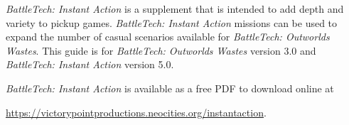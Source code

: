 \emph{BattleTech: Instant Action} is a supplement that is intended to add depth and variety to pickup games.
\emph{BattleTech: Instant Action} missions can be used to expand the number of casual scenarios available for \emph{BattleTech: Outworlds Wastes}.
This guide is for \emph{BattleTech: Outworlds Wastes} version 3.0 and \emph{BattleTech: Instant Action} version 5.0.

\emph{BattleTech: Instant Action} is available as a free PDF to download online at

 \href{https://victorypointproductions.neocities.org/instantaction}{https://victorypointproductions.neocities.org/instantaction}.

